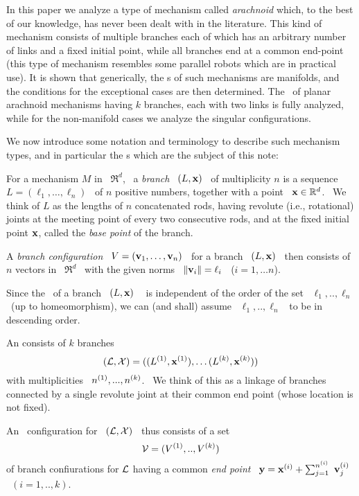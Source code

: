 In this paper we analyze a type of mechanism called
\emph{arachnoid} which, to the best of our knowledge, has never
been dealt with in the literature. This kind of mechanism consists
of multiple branches each of which has an arbitrary number of
links and a fixed initial point, while all branches end at a
common end-point (this type of mechanism resembles some parallel
robots which are in practical use). It is shown that generically,
the \cspace s of such mechanisms are manifolds, and the conditions
for the exceptional cases are then determined. The \cspace\  of
planar arachnoid mechanisms having $k$ branches, each with two
links is fully analyzed, while for the non-manifold cases we
analyze the singular configurations.

We now introduce some notation and terminology to describe such
mechanism types, and in particular the \smech s which are the
subject of this note:

\begin{defn}
%
For a mechanism $M$ in \ $\Re^{d}$, \ a \emph{branch} \ $(L,\mathbf{x})$
\ of multiplicity $n$ is a sequence \
$L=(\ell_{1},\dotsc,\ell_{n})$ \ of $n$ positive numbers, together
with a point \ $\mathbf{x}\in\mathbb{R}^{d}$. \ We think of $L$ as the lengths
of $n$ concatenated rods, having revolute (i.e., rotational)
joints at the meeting point of every two consecutive rods, and at
the fixed initial point $\mathbf{x}$, called the \emph{base point} of the
branch.

A \emph{branch configuration} \ $V=(\mathbf{v}_{1},\dotsc,\mathbf{v}_{n})$ \ for
a branch \ $(L,\mathbf{x})$ \ then consists of $n$ vectors in \ $\Re^{d}$
\ with the given norms \ $\|\mathbf{v}_{i}\|=\ell_{i}$ \ ($i=1,\dotsc
n$).
\end{defn}


Since the \cspace\ of a branch \ $(L,\mathbf{x})$ \  is
independent of the order of the set \ $\ell_1,..,\ell_n$ \ (up to
homeomorphism), we can (and shall) assume \ $\ell_1,..,\ell_n$ \
to be in descending order.

\begin{defn}
%
An \emph{\smech} consists of $k$ branches \ $$
(\mathcal{L},\mathcal{X})=((L\sp{({1})},\mathbf{x}\sp{({1})}),\dotsc (L\sp{({k})},\mathbf{x}\sp{({k})})) $$
\newnot{1-2} with multiplicities \ $n\sp{({1})},...,n\sp{({k})}$. \ We think
of this as a linkage of branches connected by a single revolute
joint at their common end point (whose location is not fixed).
\newnot{1-4}

An \smech\ configuration for \ $(\mathcal{L},\mathcal{X})$ \ thus consists of a
set $$ \mathcal{V}=(V\sp{({1})},..,V\sp{({k})}) $$ of branch confiurations for $\mathcal{L}$
having a common \emph{end point}  \
$\mathbf{y}=\mathbf{x}\sp{({i})}+\sum_{j=1}^{n\sp{({i})}}~\mathbf{v}\sp{({i})}_{j}$ \ $(i=1,..,k)$. \
  \end{defn}

